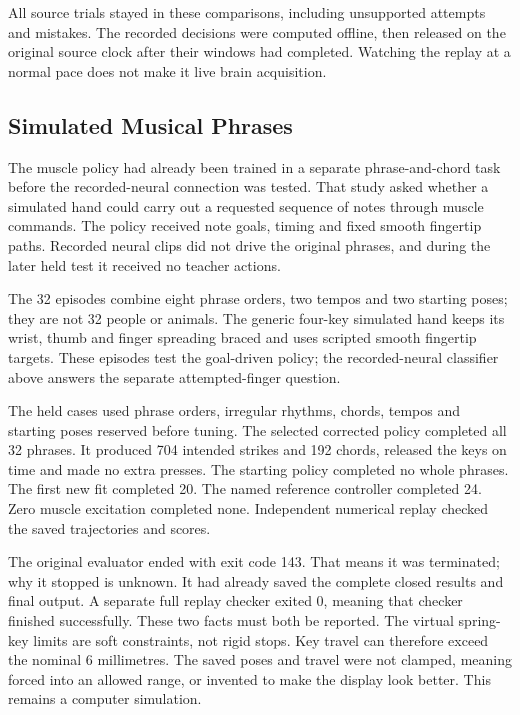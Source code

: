All source trials stayed in these comparisons, including unsupported attempts
and mistakes. The recorded decisions were computed offline, then released on the
original source clock after their windows had completed. Watching the replay
at a normal pace does not make it live brain acquisition.

\subsection{Simulated Musical Phrases}

The muscle policy had already been trained in a separate phrase-and-chord task
before the recorded-neural connection was tested. That study asked whether a
simulated hand could carry out a requested sequence of notes through muscle
commands. The policy received note goals, timing and fixed smooth fingertip
paths. Recorded neural clips did not drive the original phrases, and during
the later held test it received no teacher actions.

The 32 episodes combine eight phrase orders, two tempos and two starting poses;
they are not 32 people or animals. The generic four-key simulated hand keeps
its wrist, thumb and finger spreading braced and uses scripted smooth fingertip
targets. These episodes test the goal-driven policy; the recorded-neural
classifier above answers the separate attempted-finger question.

The held cases used phrase orders, irregular rhythms, chords, tempos and starting
poses reserved before tuning. The selected corrected policy completed all 32
phrases. It produced 704 intended strikes and 192 chords, released the keys on
time and made no extra presses. The starting policy completed no whole phrases.
The first new fit completed 20. The named reference controller completed 24.
Zero muscle excitation completed none. Independent numerical replay checked the
saved trajectories and scores.

The original evaluator ended with exit code 143. That means it was terminated; why it stopped is unknown. It had already saved the complete closed results and final output. A separate full replay checker exited 0, meaning that checker finished successfully. These two facts must both be reported. The virtual spring-key limits are soft constraints, not rigid stops. Key travel can therefore exceed the nominal 6 millimetres. The saved poses and travel were not clamped, meaning forced into an allowed range, or invented to make the display look better. This remains a computer simulation.

